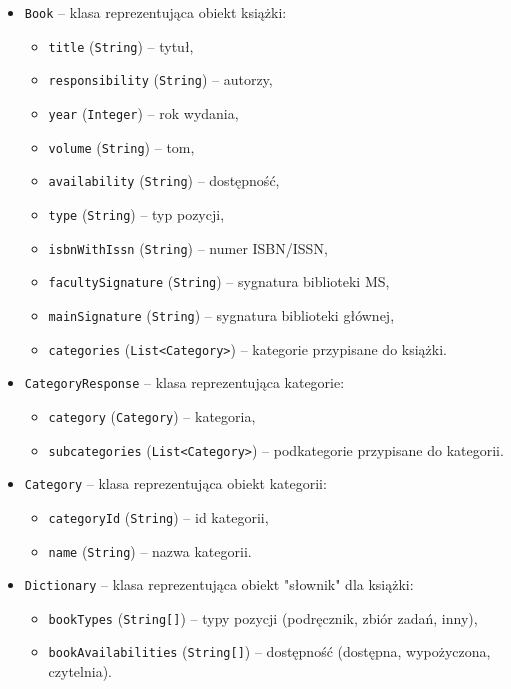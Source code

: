 \documentclass[twoside]{projektInzynierskiMS}
\begin{document}
\begin{itemize}
\item \verb`Book` -- klasa reprezentująca obiekt książki:
\begin{itemize}
\item \verb`title` (\verb`String`) -- tytuł,
\item \verb`responsibility` (\verb`String`) -- autorzy,
\item \verb`year` (\verb`Integer`) -- rok wydania,
\item \verb`volume` (\verb`String`) -- tom,
\item \verb`availability` (\verb`String`) -- dostępność,
\item \verb`type` (\verb`String`) -- typ pozycji,
\item \verb`isbnWithIssn` (\verb`String`) -- numer ISBN/ISSN,
\item \verb`facultySignature` (\verb`String`) -- sygnatura biblioteki MS,
\item \verb`mainSignature` (\verb`String`) -- sygnatura biblioteki głównej,
\item \verb`categories` (\verb`List<Category>`) -- kategorie przypisane do książki.
\end{itemize}
\item \verb`CategoryResponse` -- klasa reprezentująca kategorie:
\begin{itemize}
\item \verb`category` (\verb`Category`) -- kategoria,
\item \verb`subcategories` (\verb`List<Category>`) -- podkategorie przypisane do kategorii.
\end{itemize}
\item \verb`Category` -- klasa reprezentująca obiekt kategorii:
\begin{itemize}
\item \verb`categoryId` (\verb`String`) -- id kategorii,
\item \verb`name` (\verb`String`) -- nazwa kategorii.
\end{itemize}
\item \verb`Dictionary` -- klasa reprezentująca obiekt "słownik" dla książki:
\begin{itemize}
\item \verb`bookTypes` (\verb`String[]`) -- typy pozycji (podręcznik, zbiór zadań, inny),
\item \verb`bookAvailabilities` (\verb`String[]`) -- dostępność (dostępna, wypożyczona, czytelnia).
\end{itemize}
\end{itemize}
\end{document}
